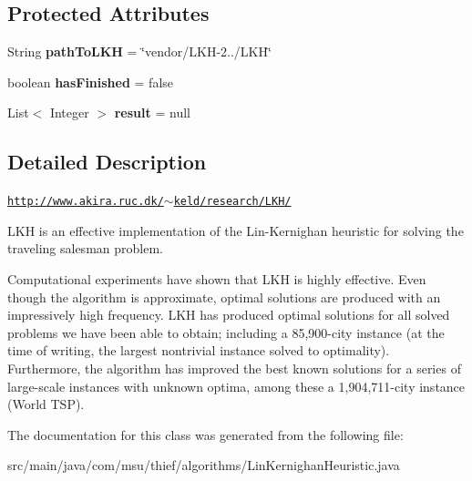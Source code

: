 \subsection*{Protected Attributes}
\begin{DoxyCompactItemize}
\item 
\hypertarget{classcom_1_1msu_1_1thief_1_1algorithms_1_1LinKernighanHeuristic_aed44e2908fc11d4667e59e1c495367b6}{String {\bfseries path\-To\-L\-K\-H} = \char`\"{}vendor/L\-K\-H-\/2../L\-K\-H\char`\"{}}\label{classcom_1_1msu_1_1thief_1_1algorithms_1_1LinKernighanHeuristic_aed44e2908fc11d4667e59e1c495367b6}

\item 
\hypertarget{classcom_1_1msu_1_1thief_1_1algorithms_1_1LinKernighanHeuristic_a69abbf13ef9b90341f669d787ea97682}{boolean {\bfseries has\-Finished} = false}\label{classcom_1_1msu_1_1thief_1_1algorithms_1_1LinKernighanHeuristic_a69abbf13ef9b90341f669d787ea97682}

\item 
\hypertarget{classcom_1_1msu_1_1thief_1_1algorithms_1_1LinKernighanHeuristic_a645f83bba743a10eb8ba7dc721a80ea4}{List$<$ Integer $>$ {\bfseries result} = null}\label{classcom_1_1msu_1_1thief_1_1algorithms_1_1LinKernighanHeuristic_a645f83bba743a10eb8ba7dc721a80ea4}

\end{DoxyCompactItemize}


\subsection{Detailed Description}
\href{http://www.akira.ruc.dk/~keld/research/LKH/}{\tt http\-://www.\-akira.\-ruc.\-dk/$\sim$keld/research/\-L\-K\-H/}

L\-K\-H is an effective implementation of the Lin-\/\-Kernighan heuristic for solving the traveling salesman problem.

Computational experiments have shown that L\-K\-H is highly effective. Even though the algorithm is approximate, optimal solutions are produced with an impressively high frequency. L\-K\-H has produced optimal solutions for all solved problems we have been able to obtain; including a 85,900-\/city instance (at the time of writing, the largest nontrivial instance solved to optimality). Furthermore, the algorithm has improved the best known solutions for a series of large-\/scale instances with unknown optima, among these a 1,904,711-\/city instance (World T\-S\-P). 

The documentation for this class was generated from the following file\-:\begin{DoxyCompactItemize}
\item 
src/main/java/com/msu/thief/algorithms/Lin\-Kernighan\-Heuristic.\-java\end{DoxyCompactItemize}
